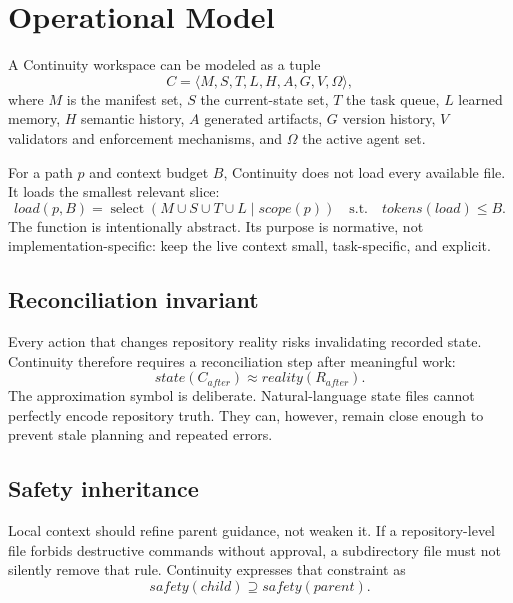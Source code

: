 
\section{Operational Model}



A Continuity workspace can be modeled as a tuple
\begin{equation}
\label{eq:workspace}
C = \langle M, S, T, L, H, A, G, V, \Omega \rangle,
\end{equation}
where $M$ is the manifest set, $S$ the current-state set, $T$ the task queue, $L$ learned memory, $H$ semantic history, $A$ generated artifacts, $G$ version history, $V$ validators and enforcement mechanisms, and $\Omega$ the active agent set.

For a path $p$ and context budget $B$, Continuity does not load every available file. It loads the smallest relevant slice:
\begin{equation}
\label{eq:load}
load(p,B)=\operatorname{select}(M\cup S\cup T\cup L\mid scope(p)) \quad \text{s.t.} \quad tokens(load)\leq B.
\end{equation}
The function is intentionally abstract. Its purpose is normative, not implementation-specific: keep the live context small, task-specific, and explicit.

\subsection{Reconciliation invariant}

Every action that changes repository reality risks invalidating recorded state. Continuity therefore requires a reconciliation step after meaningful work:
\begin{equation}
\label{eq:reconcile}
state(C_{after}) \approx reality(R_{after}).
\end{equation}
The approximation symbol is deliberate. Natural-language state files cannot perfectly encode repository truth. They can, however, remain close enough to prevent stale planning and repeated errors.



\subsection{Safety inheritance}

Local context should refine parent guidance, not weaken it. If a repository-level file forbids destructive commands without approval, a subdirectory file must not silently remove that rule. Continuity expresses that constraint as
\begin{equation}
\label{eq:safety}
safety(child) \supseteq safety(parent).
\end{equation}

